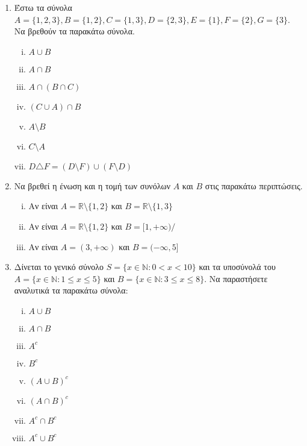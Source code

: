 \documentclass[a4paper,table]{report}
\begin{document}
\begin{center}
  \minibox{\large\bfseries \textcolor{Col1}{Ασκήσεις στα Σύνολα}}
\end{center}

\vspace{\baselineskip}

\begin{enumerate}

\item Έστω τα σύνολα $A=\{1,2,3\}, B=\{1,2\}, C=\{1,3\}, D=\{2,3\}, E=\{1\}, F=\{2\}, G=\{3\}$. Να βρεθούν τα παρακάτω σύνολα.

\begin{enumerate}[i)]

\item $A\cup B$
\item $A\cap B$
\item $A\cap (B\cap C)$
\item $(C\cup A)\cap B$
\item $A\setminus B$
\item $C\setminus A$
\item $D\triangle F = (D\setminus F)\cup(F\setminus D)$
\end{enumerate}

\item Να βρεθεί η ένωση και η τομή των συνόλων $A$ και $B$ στις παρακάτω περιπτώσεις.

\begin{enumerate}[i)]

\item Αν είναι $A=\mathbb{R}\setminus\{1,2\}$ και $B=\mathbb{R}\setminus\{1,3\}$
\item Αν είναι $A=\mathbb{R}\setminus\{1,2\}$ και $B=[1,+\infty)/$
\item Αν είναι $A=(3,+\infty)$ και $B=(-\infty,5]$
\end{enumerate}

\item Δίνεται το γενικό σύνολο $S=\{x\in \mathbb{N} : 0<x<10\}$ και τα υποσύνολά του $A=\{x\in \mathbb{N} : 1\leq x\leq 5\}$ και $B=\{x\in \mathbb{N} : 3\leq x\leq 8\}$. Να παραστήσετε αναλυτικά τα παρακάτω σύνολα:

\begin{enumerate}[i)]

\item $A\cup B$
\item $A\cap B$
\item $A^c$
\item $B^c$
\item $(A\cup B)^c$
\item $(A\cap B)^c$
\item $A^c\cap B^c$
\item $A^c\cup B^c$
\end{enumerate}



\end{enumerate}
\end{document}
